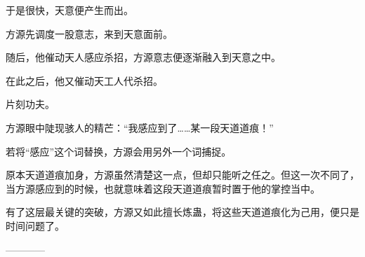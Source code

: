 \begin{this_body}
于是很快，天意便产生而出。

方源先调度一股意志，来到天意面前。

随后，他催动天人感应杀招，方源意志便逐渐融入到天意之中。

在此之后，他又催动天工人代杀招。

片刻功夫。

方源眼中陡现骇人的精芒：“我感应到了……某一段天道道痕！”

若将“感应”这个词替换，方源会用另外一个词捕捉。

原本天道道痕加身，方源虽然清楚这一点，但却只能听之任之。但这一次不同了，当方源感应到的时候，也就意味着这段天道道痕暂时置于他的掌控当中。

有了这层最关键的突破，方源又如此擅长炼蛊，将这些天道道痕化为己用，便只是时间问题了。

------------

\end{this_body}

